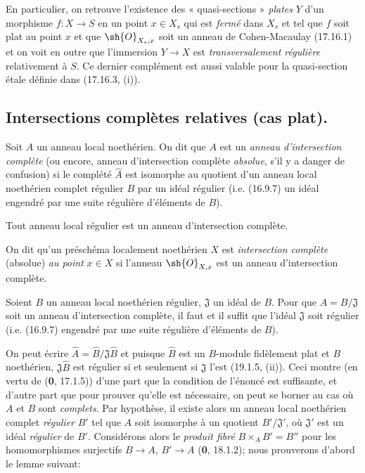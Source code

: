 En particulier, on retrouve l'existence des « quasi-sections » \emph{plates} $Y$ d'un morphisme $f:X\to S$ en un point $x\in X_s$ qui est \emph{fermé} dans $X_s$ et tel que $f$ soit plat au point $x$ et que $\sh{O}_{X_s,x}$ soit un anneau de Cohen-Macaulay (17.16.1) et on voit en outre que l'immersion $Y\to X$ est \emph{transversalement régulière} relativement à $S$. Ce dernier complément est aussi valable pour la quasi-section étale définie dans (17.16.3, (i)).


\subsection{Intersections complètes relatives (cas plat).}

\begin{definition}[19.3.1]
Soit $A$ un anneau local noethérien. On dit que $A$ est un \emph{anneau d'intersection complète} (ou encore, anneau d'intersection complète \emph{absolue}, s'il y a danger de confusion) si le complété $\widehat A$ est isomorphe au quotient d'un anneau local noethérien complet \textup{régulier} $B$ par un idéal \textup{régulier (i.e. (16.9.7)} un idéal engendré par une suite régulière d'éléments de $B$\textup{)}.
\end{definition}

Tout anneau local régulier est un anneau d'intersection complète.

On dit qu'un préschéma localement noethérien $X$ est \emph{intersection complète} (absolue) \emph{au point} $x\in X$ si l'anneau $\sh{O}_{X,x}$ est un anneau d'intersection complète.

\begin{proposition}[19.3.2]
\label{IV.19.3.2}
Soient $B$ un anneau local noethérien régulier, $\mathfrak J$ un idéal de $B$. Pour que $A=B/\mathfrak J$ soit un anneau d'intersection complète, il faut et il suffit que l'idéal $\mathfrak J$ soit régulier \textup{(i.e. (16.9.7)} engendré par une suite régulière d'éléments de $B$\textup{)}.
\end{proposition}

On peut écrire $\widehat A=\widehat B/\mathfrak J\widehat B$ et puisque $\widehat B$ est un $B$-module fidèlement plat et $B$ noethérien, $\mathfrak J\widehat B$ est régulier si et seulement si $\mathfrak J$ l'est (19.1.5, (ii)). Ceci montre (en vertu de (\textbf{0}, 17.1.5)) d'une part que la condition de l'énoncé est suffisante, et d'autre part que pour prouver qu'elle est nécessaire, on peut se borner au cas où $A$ et $B$ sont \emph{complets}. Par hypothèse, il existe alors un anneau local noethérien complet \emph{régulier} $B'$ tel que $A$ soit isomorphe à un quotient $B'/\mathfrak J'$, où $\mathfrak J'$ est un idéal \emph{régulier} de $B'$. Considérons alors le \emph{produit fibré} $B\times_A B'=B''$ pour les homomorphismes surjectifs $B\to A$, $B'\to A$ (\textbf{0}, 18.1.2); nous prouverons d'abord le lemme suivant:

